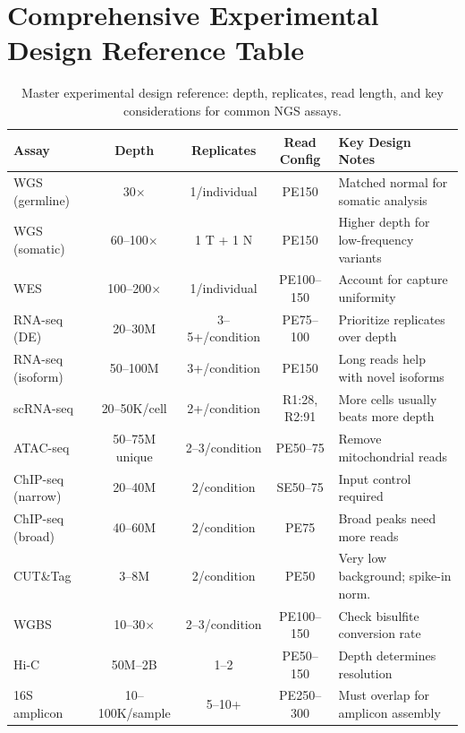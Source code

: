 \section{Comprehensive Experimental Design Reference Table}
\label{sec:expdesign:mastertable}

\begin{table}[htbp]
\centering
\caption{Master experimental design reference: depth, replicates, read length, and key considerations for common NGS assays.}
\label{tab:master-design}
\small
\renewcommand{\arraystretch}{1.2}
\begin{tabularx}{\textwidth}{@{}l c c c X@{}}
\toprule
\textbf{Assay} & \textbf{Depth} & \textbf{Replicates} & \textbf{Read Config} & \textbf{Key Design Notes} \\
\midrule
WGS (germline) & 30$\times$ & 1/individual & PE150 & Matched normal for somatic analysis \\
WGS (somatic) & 60--100$\times$ & 1 T + 1 N & PE150 & Higher depth for low-frequency variants \\
WES & 100--200$\times$ & 1/individual & PE100--150 & Account for capture uniformity \\
RNA-seq (DE) & 20--30M & 3--5+/condition & PE75--100 & Prioritize replicates over depth \\
RNA-seq (isoform) & 50--100M & 3+/condition & PE150 & Long reads help with novel isoforms \\
scRNA-seq & 20--50K/cell & 2+/condition & R1:28, R2:91 & More cells usually beats more depth \\
ATAC-seq & 50--75M unique & 2--3/condition & PE50--75 & Remove mitochondrial reads \\
ChIP-seq (narrow) & 20--40M & 2/condition & SE50--75 & Input control required \\
ChIP-seq (broad) & 40--60M & 2/condition & PE75 & Broad peaks need more reads \\
CUT\&Tag & 3--8M & 2/condition & PE50 & Very low background; spike-in norm. \\
WGBS & 10--30$\times$ & 2--3/condition & PE100--150 & Check bisulfite conversion rate \\
Hi-C & 50M--2B & 1--2 & PE50--150 & Depth determines resolution \\
16S amplicon & 10--100K/sample & 5--10+ & PE250--300 & Must overlap for amplicon assembly \\
\bottomrule
\end{tabularx}
\end{table}

